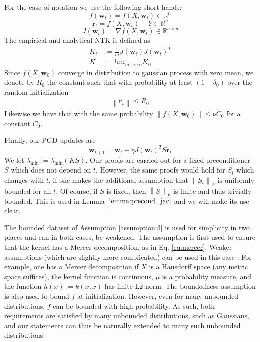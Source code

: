 \documentclass[10pt]{article} %
\theoremstyle{plain}
\theoremstyle{definition}
\theoremstyle{remark}
\newcommand{\Real}{\mathbb{R}}
\newcommand{\norm}[1]{\left\lVert#1\right\rVert}
\newcommand{\res}{\mathbf{r}}
\newcommand{\w}{\mathbf{w}}
\begin{document}
For the ease of notation we use the following short-hands:
\begin{equation}\label{eq:app_notationsF}
    f(\w_t) = f(X,\w_t)\in \Real ^n
\end{equation}
\begin{equation}\label{eq:app_notationsG}
   \res_t = f(X,\w_t) - Y \in \Real ^n
\end{equation}
\begin{equation}\label{eq:app_notationsJ}
    J(\w_t) = \nabla f(X,\w_t)\in \Real ^{n\times p}
\end{equation}
The empirical and analytical NTK is defined as 
\begin{align*}
    K_t &:= \frac{1}{m}J(\w_t)J(\w_t)^T\\
    K &:= lim_{m\rightarrow \infty } K_0
\end{align*}
Since $ f(X,\w_0)$ converge in distribution to gaussian process with zero mean, we denote by $R_0$ the constant such that with probability at least $(1-\delta_0)$ over the random initialization
\begin{align}\label{eq:g_init}
    \norm{\res_t}\leq R_0
\end{align}
Likewise we have that with the same probability $\norm{f(X,\w_0)}\leq \nu C_0 $ for a constant $C_0$. 

Finally, our PGD updates are
\begin{equation}\label{eq:pgd_updates}
    \w_{t+1}=\w_t-\eta J(\w_t)^TS\res_t
\end{equation}
We let $\lambda_{\min}:=\lambda_{\min}(KS)$. Our proofs are carried out for a fixed preconditioner $S$ which does not depend on $t$. However, the same proofs would hold for $S_t$ which changes with $t$, if one makes the additional assumption that $\norm{S_t}_F$ is uniformly bounded for all $t$. Of course, if $S$ is fixed, then $\norm{S}_F$ is finite and thus trivially bounded. This is used in Lemma $\ref{lemma:precond_jac}$ and we will make its use clear.

The bounded dataset of Assumption \ref{assumption:3} is used for simplicity in two places and can in both cases, be weakened. The assumption is first used to ensure that the kernel has a Mercer decomposition, as in Eq. \eqref{eq:mercer}. Weaker assumptions (which are slightly more complicated) can be used in this case \citep{steinwart2012mercer}. For example, one has a Mercer decomposition if $X$ is a Hausdorff space (any metric space suffices), the kernel function is continuous, $\mu$ is a probability measure, and the function $h(x):=k(x,x)$ has finite L2 norm. The boundedness assumption is also used to bound $f$ at initialization. However, even for many unbounded distributions, $f$ can be bounded with high probability. As such, both requirements are satisfied by many unbounded distributions, such as Gaussians, and our statements can thus be naturally extended to many such unbounded distributions.
\end{document}
